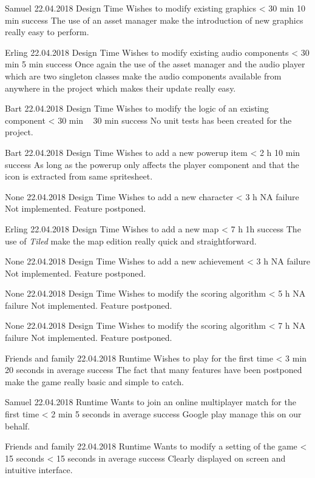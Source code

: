 {Samuel}
{22.04.2018}
{Design Time}
{Wishes to modify existing graphics}
{< 30 min}
{10 min}
{success}
{The use of an asset manager make the introduction of new graphics really easy to perform.}

{Erling}
{22.04.2018}
{Design Time}
{Wishes to modify existing audio components}
{< 30 min}
{5 min}
{success}
{Once again the use of the asset manager and the audio player which are two singleton classes make the audio components available from anywhere in the project which makes their update really easy.}

{Bart}
{22.04.2018}
{Design Time}
{Wishes to modify the logic of an existing component}
{< 30 min}
{~ 30 min}
{success}
{No unit tests has been created for the project.}

{Bart}
{22.04.2018}
{Design Time}
{Wishes to add a new powerup item}
{< 2 h}
{10 min}
{success}
{As long as the powerup only affects the player component and that the icon is extracted from same spritesheet.}

{None}
{22.04.2018}
{Design Time}
{Wishes to add a new character}
{< 3 h}
{NA}
{failure}
{Not implemented. Feature postponed.}

{Erling}
{22.04.2018}
{Design Time}
{Wishes to add a new map}
{< 7 h}
{1h}
{success}
{The use of \textit{Tiled} make the map edition really quick and straightforward.}

{None}
{22.04.2018}
{Design Time}
{Wishes to add a new achievement}
{< 3 h}
{NA}
{failure}
{Not implemented. Feature postponed.}

{None}
{22.04.2018}
{Design Time}
{Wishes to modify the scoring algorithm}
{< 5 h}
{NA}
{failure}
{Not implemented. Feature postponed.}

{None}
{22.04.2018}
{Design Time}
{Wishes to modify the scoring algorithm}
{< 7 h}
{NA}
{failure}
{Not implemented. Feature postponed.}

{Friends and family}
{22.04.2018}
{Runtime}
{Wishes to play for the first time}
{< 3 min}
{20 seconds in average}
{success}
{The fact that many features have been postponed make the game really basic and simple to catch.}

{Samuel}
{22.04.2018}
{Runtime}
{Wants to join an online multiplayer match for the first time}
{< 2 min}
{5 seconds in average}
{success}
{Google play manage this on our behalf.}

{Friends and family}
{22.04.2018}
{Runtime}
{Wants to modify a setting of the game}
{< 15 seconds}
{< 15 seconds in average}
{success}
{Clearly displayed on screen and intuitive interface.}

